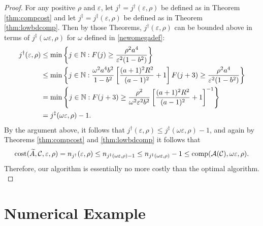 \documentclass[graybox,footinfo]{svmult}
\begin{document}
\begin{proof}
{For any positive $\rho$ and $\varepsilon$, let $j^\dagger = j^\dagger(\varepsilon,\rho)$ be defined as in Theorem \ref{thm:compcost} and let $j^\ddagger = j^\ddagger(\varepsilon,\rho)$ be defined as in Theorem \ref{thm:lowbdcomp}.  Then by those Theorems, $j^\dagger(\varepsilon,\rho)$ can be bounded above in terms of $ j^{\ddagger}(\omega\varepsilon,\rho)$ for $\omega$ defined in \eqref{newomegadef}:
\begin{align*} 
j^\dagger(\varepsilon,\rho) &\le \min \left \{j \in {\mathbb{N}} : F(j) \ge \frac{\rho^2 a^4}{\varepsilon^2 (1-b^2)}   \right\} \\
& \le \min \left \{j \in {\mathbb{N}} : \frac{\omega^2 a^4 b^2}{1 - b^2}\left[\frac{(a+1)^{2} R^2 }{(a-1)^2} + 1\right] F(j+3) \ge \frac{\rho^2 a^4}{\varepsilon^2 (1-b^2)}    \right\} \\
& = \min \left \{j \in {\mathbb{N}} :  F(j+3) \ge \frac{\rho^2}{\omega^2 \varepsilon^2 b^2} \left[\frac{(a+1)^{2} R^2 }{(a-1)^2} + 1\right]^{-1} \right\} \\
& = j^{\ddagger}(\omega\varepsilon,\rho) - 1.
\end{align*}
By the argument above, it follows that $ j^\dagger(\varepsilon,\rho) \le j^\ddagger(\omega\varepsilon,\rho) -1$, and again by Theorems \ref{thm:compcost} and  \ref{thm:lowbdcomp} it follows that 
\[
\textup{cost}(\widetilde{A},{\mathcal{C}},\varepsilon,\rho)
= n_{j^\dagger}(\varepsilon,\rho)
\le n_{j^{\ddagger}(\omega\varepsilon,\rho)-1} 
\le n_{j^{\ddagger}(\omega\varepsilon,\rho)} -1 
\le \textup{comp}({\mathcal{A}}({\mathcal{C}}),\omega\varepsilon,\rho) .
\]
Therefore, our algorithm is essentially no more costly than the optimal algorithm. }
\end{proof}

 


\section{Numerical Example} \label{sec:examp}
\end{document}
